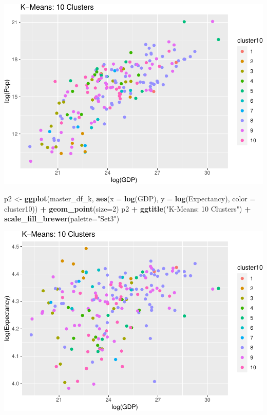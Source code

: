 \documentclass[]{article}
\newenvironment{Shaded}{\begin{snugshade}}{\end{snugshade}}
\newcommand{\DataTypeTok}[1]{\textcolor[rgb]{0.13,0.29,0.53}{#1}}
\newcommand{\DecValTok}[1]{\textcolor[rgb]{0.00,0.00,0.81}{#1}}
\newcommand{\KeywordTok}[1]{\textcolor[rgb]{0.13,0.29,0.53}{\textbf{#1}}}
\newcommand{\NormalTok}[1]{#1}
\newcommand{\OperatorTok}[1]{\textcolor[rgb]{0.81,0.36,0.00}{\textbf{#1}}}
\newcommand{\StringTok}[1]{\textcolor[rgb]{0.31,0.60,0.02}{#1}}
\begin{document}
\includegraphics{eda_files/figure-latex/unnamed-chunk-30-1.pdf}

\begin{Shaded}
\begin{Highlighting}[]
\NormalTok{p2 <-}\StringTok{ }\KeywordTok{ggplot}\NormalTok{(master_df_k, }\KeywordTok{aes}\NormalTok{(}\DataTypeTok{x =} \KeywordTok{log}\NormalTok{(GDP), }\DataTypeTok{y =} \KeywordTok{log}\NormalTok{(Expectancy), }\DataTypeTok{color =}\NormalTok{ cluster10)) }\OperatorTok{+}
\StringTok{  }\KeywordTok{geom_point}\NormalTok{(}\DataTypeTok{size=}\DecValTok{2}\NormalTok{)}
\NormalTok{p2 }\OperatorTok{+}\StringTok{ }\KeywordTok{ggtitle}\NormalTok{(}\StringTok{"K-Means: 10 Clusters"}\NormalTok{) }\OperatorTok{+}\StringTok{ }\KeywordTok{scale_fill_brewer}\NormalTok{(}\DataTypeTok{palette=}\StringTok{"Set3"}\NormalTok{)}
\end{Highlighting}
\end{Shaded}

\includegraphics{eda_files/figure-latex/unnamed-chunk-30-2.pdf}
\end{document}
